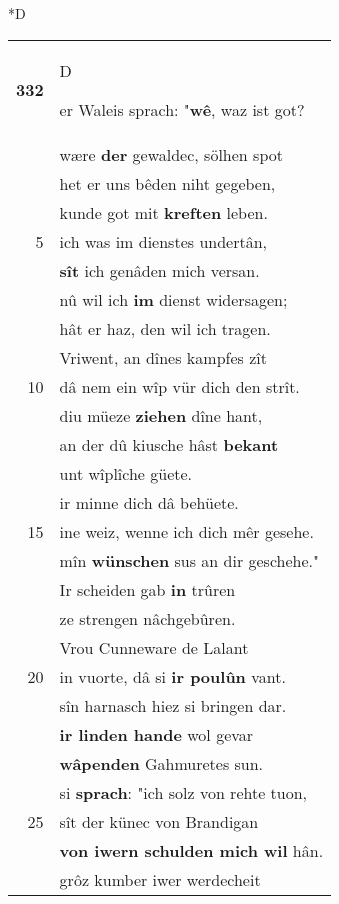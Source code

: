 \documentclass[8pt,a4paper,notitlepage]{article}
\begin{document}
\begin{table}[ht]
\begin{minipage}[t]{0.5\linewidth}
\small
\begin{center}*D
\end{center}
\begin{tabular}{rl}
\textbf{332} & \begin{large}D\end{large}er Waleis sprach: "\textbf{wê}, waz ist got?\\ 
 & wære \textbf{der} gewaldec, sölhen spot\\ 
 & het er uns bêden niht gegeben,\\ 
 & kunde got mit \textbf{kreften} leben.\\ 
5 & ich was im dienstes undertân,\\ 
 & \textbf{sît} ich genâden mich versan.\\ 
 & nû wil ich \textbf{im} dienst widersagen;\\ 
 & hât er haz, den wil ich tragen.\\ 
 & Vriwent, an dînes kampfes zît\\ 
10 & dâ nem ein wîp vür dich den strît.\\ 
 & diu müeze \textbf{ziehen} dîne hant,\\ 
 & an der dû kiusche hâst \textbf{bekant}\\ 
 & unt wîplîche güete.\\ 
 & ir minne dich dâ behüete.\\ 
15 & ine weiz, wenne ich dich mêr gesehe.\\ 
 & mîn \textbf{wünschen} sus an dir geschehe."\\ 
 & Ir scheiden gab \textbf{in} trûren\\ 
 & ze strengen nâchgebûren.\\ 
 & Vrou Cunneware de Lalant\\ 
20 & in vuorte, dâ si \textbf{ir poulûn} vant.\\ 
 & sîn harnasch hiez si bringen dar.\\ 
 & \textbf{ir linden hande} wol gevar\\ 
 & \textbf{wâpenden} Gahmuretes sun.\\ 
 & si \textbf{sprach}: "ich solz von rehte tuon,\\ 
25 & sît der künec von Brandigan\\ 
 & \textbf{von iwern schulden mich wil} hân.\\ 
 & grôz kumber iwer werdecheit\\ 

\end{tabular}
\end{minipage}
\end{table}
\end{document}
